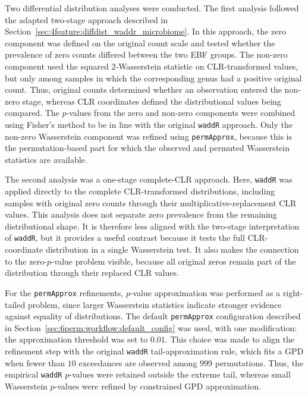Two differential distribution analyses were conducted. The first analysis followed the adapted two-stage approach described in Section~\ref{sec:4feature:diffdist_waddr_microbiome}. In this approach, the zero component was defined on the original count scale and tested whether the prevalence of zero counts differed between the two EBF groups. The non-zero component used the squared 2-Wasserstein statistic on CLR-transformed values, but only among samples in which the corresponding genus had a positive original count. Thus, original counts determined whether an observation entered the non-zero stage, whereas CLR coordinates defined the distributional values being compared. The $p$-values from the zero and non-zero components were combined using Fisher's method to be in line with the original \texttt{waddR} approach. Only the non-zero Wasserstein component was refined using \texttt{permApprox}, because this is the permutation-based part for which the observed and permuted Wasserstein statistics are available.

The second analysis was a one-stage complete-CLR approach. Here, \texttt{waddR} was applied directly to the complete CLR-transformed distributions, including samples with original zero counts through their multiplicative-replacement CLR values. This analysis does not separate zero prevalence from the remaining distributional shape. It is therefore less aligned with the two-stage interpretation of \texttt{waddR}, but it provides a useful contrast because it tests the full CLR-coordinate distribution in a single Wasserstein test. It also makes the connection to the zero-$p$-value problem visible, because all original zeros remain part of the distribution through their replaced CLR values.

For the \texttt{permApprox} refinements, $p$-value approximation was performed as a right-tailed problem, since larger Wasserstein statistics indicate stronger evidence against equality of distributions. The default \texttt{permApprox} configuration described in Section~\ref{sec:6perm:workflow:default_config} was used, with one modification: the approximation threshold was set to $0.01$. This choice was made to align the refinement step with the original \texttt{waddR} tail-approximation rule, which fits a GPD when fewer than $10$ exceedances are observed among $999$ permutations. Thus, the empirical \texttt{waddR} $p$-values were retained outside the extreme tail, whereas small Wasserstein $p$-values were refined by constrained GPD approximation.

